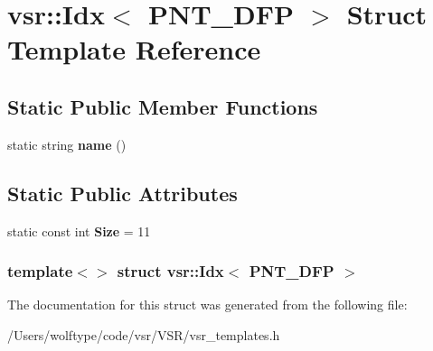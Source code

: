 \hypertarget{structvsr_1_1_idx_3_01_p_n_t___d_f_p_01_4}{\section{vsr\-:\-:Idx$<$ P\-N\-T\-\_\-\-D\-F\-P $>$ Struct Template Reference}
\label{structvsr_1_1_idx_3_01_p_n_t___d_f_p_01_4}
}
\subsection*{Static Public Member Functions}
\begin{DoxyCompactItemize}
\item 
\hypertarget{structvsr_1_1_idx_3_01_p_n_t___d_f_p_01_4_af871e7ae3a2044931d7498d86b82eee7}{static string {\bfseries name} ()}\label{structvsr_1_1_idx_3_01_p_n_t___d_f_p_01_4_af871e7ae3a2044931d7498d86b82eee7}

\end{DoxyCompactItemize}
\subsection*{Static Public Attributes}
\begin{DoxyCompactItemize}
\item 
\hypertarget{structvsr_1_1_idx_3_01_p_n_t___d_f_p_01_4_aa2fc4998b3c1e63e57fe08accf2f8980}{static const int {\bfseries Size} = 11}\label{structvsr_1_1_idx_3_01_p_n_t___d_f_p_01_4_aa2fc4998b3c1e63e57fe08accf2f8980}

\end{DoxyCompactItemize}
\subsubsection*{template$<$$>$ struct vsr\-::\-Idx$<$ P\-N\-T\-\_\-\-D\-F\-P $>$}



The documentation for this struct was generated from the following file\-:\begin{DoxyCompactItemize}
\item 
/\-Users/wolftype/code/vsr/\-V\-S\-R/vsr\-\_\-templates.\-h\end{DoxyCompactItemize}
